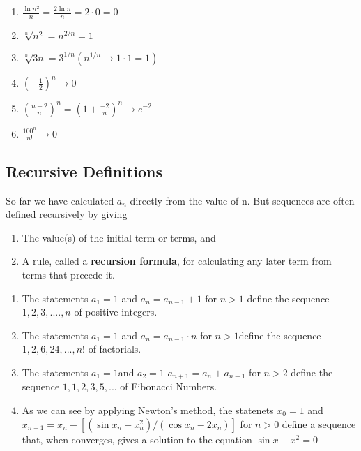 \documentclass[12pt,a4paper]{article}
\begin{document}
\begin{example}

    \begin{multicols}{2}

        \begin{enumerate}[label=\alph*)]
            \item  \(\frac{\ln n^2}{n} = \frac{2 \ln n}{n} = 2 \cdot 0 = 0\)
            \item \(\sqrt[n]{n^2} = n^{2/n} = 1\)
            \item \(\sqrt[n]{3n} = 3^{1/n}(n^{1/n} \to 1 \cdot 1 = 1)\)
            \item \(\left(-\frac{1}{2}\right)^n \to 0\)
            \item \(\left(\frac{n-2}{n}\right)^n=\left(1+\frac{-2}{n}\right)^n \to e^{-2}\)
            \item \(\frac{100^n}{n!} \to 0\)
        \end{enumerate}
        
        \end{multicols}
        


\end{example}


\newpage

\subsection{Recursive Definitions}

So far we have calculated $a_n$ directly from the value of n. But sequences are often defined recursively by giving
\begin{enumerate}
    \item The value(s) of the initial term or terms, and
    \item A rule, called a \textbf{recursion formula}, for calculating any later term from terms that precede it.
\end{enumerate}


\begin{example}
    
    \begin{enumerate}[label=\textbf{\alph*)}]
        \item The statements $a_1 = 1$ and $a_n = a_{n-1} +1 \text{ for } n > 1$ define the sequence $1,2,3,...., n$ of positive integers.
        \item The statements $a_1=1$ and $a_n= a_{n-1}\cdot n$ for $n > 1$define the sequence $1, 2, 6, 24, ..., n!$ of factorials.
        \item The statements $a_1=1$and $a_2=1$ $a_{n+1} = a_n + a_{n-1}$ for $n > 2$ define the sequence $ 1, 1, 2, 3, 5, ...$ of Fibonacci Numbers.
        \item As we can see by applying Newton's method, the statenets $x_0=1$ and $x_{n+1} = x_n - \left[\left(\sin x_n - x_{n}^2\right)/\left(\cos x_n -2x_n\right)\right]$ for $n>0$ define a sequence that, when converges, gives a solution to the equation $\sin x - x^2 = 0$
    \end{enumerate}

\end{example}
\end{document}
